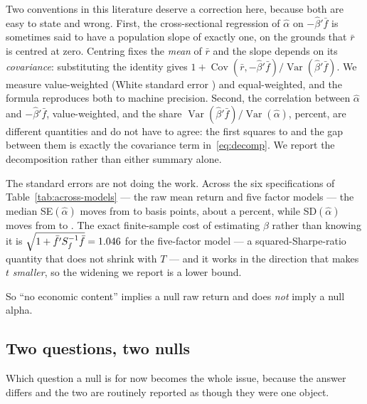 \documentclass{article}
\begin{document}
Two conventions in this literature deserve a correction here, because both are
easy to state and wrong. First, the cross-sectional regression of $\hat\alpha$
on $-\hat\beta'\bar f$ is sometimes said to have a population slope of exactly
one, on the grounds that $\bar r$ is centred at zero. Centring fixes the
\emph{mean} of $\bar r$ and the slope depends on its \emph{covariance}:
substituting the identity gives
$1 + \operatorname{Cov}(\bar r, -\hat\beta'\bar f)/\operatorname{Var}(\hat\beta'\bar f)$.
We measure \bzooamSlopeVw{} value-weighted (White standard error
\bzooamSlopeSeVw{}) and \bzooamSlopeEw{} equal-weighted, and the formula
reproduces both to machine precision. Second, the correlation between
$\hat\alpha$ and $-\hat\beta'\bar f$, \bzooexposureCorrVw{} value-weighted, and
the share $\operatorname{Var}(\hat\beta'\bar f)/\operatorname{Var}(\hat\alpha)$,
\bzooexposureVarShareVwPct{} percent, are different quantities and do not have
to agree: the first squares to \bzooamCorrSquaredVw{} and the gap between them
is exactly the covariance term in~\eqref{eq:decomp}. We report the decomposition rather than
either summary alone.

The standard errors are not doing the work. Across the six specifications of
Table~\ref{tab:across-models} --- the raw mean return and five factor models
--- the median SE$(\hat\alpha)$ moves from
\bzooamMedSeRawVw{} to \bzooamMedSeFfFiveVw{} basis points, about a percent,
while SD$(\hat\alpha)$ moves from \bzooamSdAlphaRawVw{} to
\bzooamSdAlphaFfFiveVw{}. The exact finite-sample cost of estimating $\beta$
rather than knowing it is
$\sqrt{1 + \bar f' S_f^{-1}\bar f} = 1.046{}$ for the five-factor
model --- a squared-Sharpe-ratio quantity that does not shrink with $T$ --- and
it works in the direction that makes $t$ \emph{smaller}, so the widening we
report is a lower bound.

So ``no economic content'' implies a null raw return and does \emph{not} imply a
null alpha.

\subsection{Two questions, two nulls}
\label{sec:twonulls}

Which question a null is for now becomes the whole issue, because the answer
differs and the two are routinely reported as though they were one object.
\end{document}
